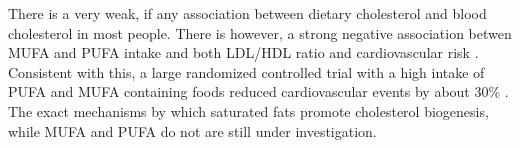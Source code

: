 \documentclass{tufte-handout}
\begin{document}
There is a very weak, if any association between dietary cholesterol and blood cholesterol in most people.  There is however, a strong negative association betwen MUFA and PUFA intake and both LDL/HDL ratio and cardiovascular risk \citep{Hu1998,Zong2016}.  Consistent with this, a large randomized controlled trial with a high intake of PUFA and MUFA containing foods reduced cardiovascular events by about 30\% \citep{Estruch2013a}.  The exact mechanisms by which saturated fats promote cholesterol biogenesis, while MUFA and PUFA do not are still under investigation.



\end{document}
